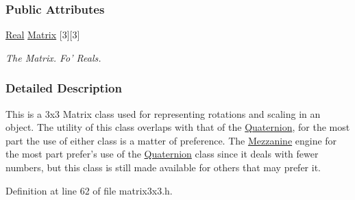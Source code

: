 \subsubsection*{Public Attributes}
\begin{DoxyCompactItemize}
\item 
\hypertarget{classMezzanine_1_1Matrix3x3_ac58c4e564ebb420d245522eec9eb63bb}{
\hyperlink{namespaceMezzanine_a726731b1a7df72bf3583e4a97282c6f6}{Real} \hyperlink{classMezzanine_1_1Matrix3x3_ac58c4e564ebb420d245522eec9eb63bb}{Matrix} \mbox{[}3\mbox{]}\mbox{[}3\mbox{]}}
\label{classMezzanine_1_1Matrix3x3_ac58c4e564ebb420d245522eec9eb63bb}

\begin{DoxyCompactList}\small\item\em The Matrix. Fo' Reals. \item\end{DoxyCompactList}\end{DoxyCompactItemize}


\subsubsection{Detailed Description}
This is a 3x3 Matrix class used for representing rotations and scaling in an object. The utility of this class overlaps with that of the \hyperlink{classMezzanine_1_1Quaternion}{Quaternion}, for the most part the use of either class is a matter of preference. The \hyperlink{namespaceMezzanine}{Mezzanine} engine for the most part prefer's use of the \hyperlink{classMezzanine_1_1Quaternion}{Quaternion} class since it deals with fewer numbers, but this class is still made available for others that may prefer it. 

Definition at line 62 of file matrix3x3.h.



